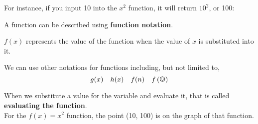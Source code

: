 \documentclass{article}
\begin{document}
For instance, if you input 10 into the $x^2$ function, it will return $10^2$, or 100:	\newline\\

\begin{center}
\end{center}
\vspace{0.25in}

A function can be described using \textbf{function notation}. 
\bigskip 

\begin{center}
\begin{framed}
$f(x)$ represents the value of the function when the value of $x$ is substituted into it.
\end{framed}
\end{center}
\bigskip 

We can use other notations for functions including, but not limited to,
\[ g(x) \quad h(x) \quad f(n) \quad f\left(\text{\Smiley}\right) \]
\bigskip 

When we substitute a value for the variable and evaluate it, that is called {\color{blue}\textbf{evaluating the function}}. \newline\\

For the $f(x) = x^2$ function, the point (10, 100) is on the graph of that function.
\bigskip 
\end{document}
